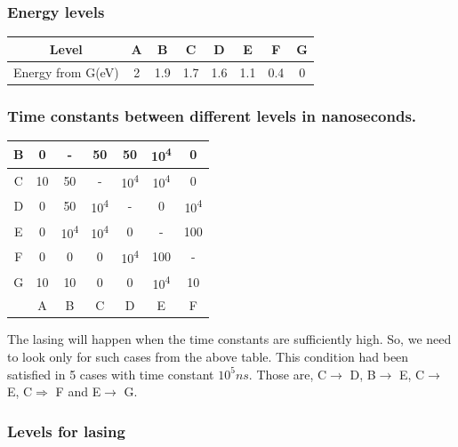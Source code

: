 \documentclass[a4paper,11pt]{article}
\begin{document}
\subsubsection*{Energy levels}
\label{sec:org476d636}
\begin{center}
\begin{tabular}{|c|c|c|c|c|c|c|c|}
\hline
Level & A & B & C & D & E & F & G\\
\hline
Energy from G(eV) & 2 & 1.9 & 1.7 & 1.6 & 1.1 & 0.4 & 0\\
\hline
\end{tabular}
\end{center}

\subsubsection*{Time constants between different levels in nanoseconds.}
\label{sec:org45662f4}
\begin{center}
\begin{tabular}{|c|c|c|c|c|c|c|}
\hline
B & 0 & - & 50 & 50 & 10\textsuperscript{4} & 0\\
\hline
C & 10 & 50 & - & 10\textsuperscript{4} & 10\textsuperscript{4} & 0\\
\hline
D & 0 & 50 & 10\textsuperscript{4} & - & 0 & 10\textsuperscript{4}\\
\hline
E & 0 & 10\textsuperscript{4} & 10\textsuperscript{4} & 0 & - & 100\\
\hline
F & 0 & 0 & 0 & 10\textsuperscript{4} & 100 & -\\
\hline
G & 10 & 10 & 0 & 0 & 10\textsuperscript{4} & 10\\
\hline
 & A & B & C & D & E & F\\
\hline
\end{tabular}
\end{center}

The lasing will happen when the time constants are sufficiently high. So, we need to look only for such cases from the above table. This condition had been satisfied in 5 cases with time constant \(10^{5} ns\). Those are,  C\(\rightarrow\) D, B\(\rightarrow\) E, C\(\rightarrow\) E, C\(\Rightarrow\) F and E\(\rightarrow\) G.

\subsubsection*{Levels for lasing}
\label{sec:orgb96d50c}
\end{document}
